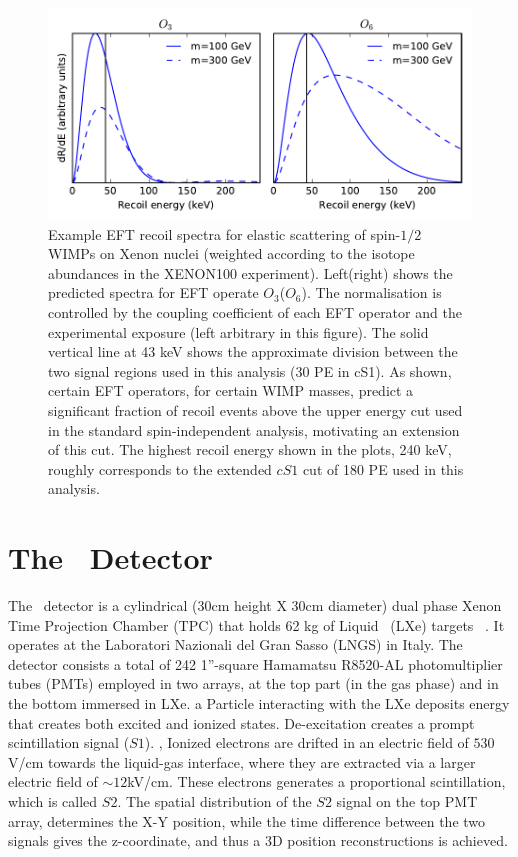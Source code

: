 \begin{itemize}
\begin{figure}[h!]
\begin{minipage}{1.\linewidth}
\centerline{\includegraphics[width=1.\linewidth]{Figures/dRdE_examples.pdf}}
\end{minipage}
\caption{Example EFT recoil spectra for elastic scattering of spin-$1/2$ WIMPs on Xenon nuclei (weighted according to the isotope abundances in the XENON100 experiment). Left(right) shows the predicted spectra for EFT operate $O_3$($O_6$). The normalisation is controlled by the coupling coefficient of each EFT operator and the experimental exposure (left arbitrary in this figure). The solid vertical line at 43 keV shows the approximate division between the two signal regions used in this analysis (30 PE in cS1). As shown, certain EFT operators, for certain WIMP masses, predict a significant fraction of recoil events above the upper energy cut used in the standard spin-independent analysis, motivating an extension of this cut. The highest recoil energy shown in the plots, 240 keV, roughly corresponds to the extended $cS1$ cut of 180 PE used in this analysis.}
\label{fig:dRdE}
\end{figure}


\end{itemize}
\section{The \Xehund\  Detector}
The \Xehund\ detector is a cylindrical (30cm height X 30cm diameter) dual phase Xenon Time Projection Chamber (TPC) that holds 62 kg of Liquid \Xe\ (LXe) targets ~\cite{xe100_instr2012}. It operates at the Laboratori Nazionali del Gran Sasso (LNGS) in Italy. The detector consists a total of 242 1”-square Hamamatsu R8520-AL photomultiplier tubes (PMTs) employed in two arrays, at the top part (in the gas phase) and in the bottom immersed in LXe. a Particle interacting with the LXe deposits energy that creates both excited and ionized states. De-excitation creates a prompt scintillation signal ($S1$). ,  Ionized electrons are drifted in an electric field of $530$V/cm towards the liquid-gas interface, where they are extracted via a larger electric field of $\sim12$kV/cm. These electrons generates a proportional scintillation, which is called $S2$. The spatial distribution of the $S2$ signal on the top PMT array, determines the X-Y position, while the time difference between the two signals gives the z-coordinate, and thus a 3D position reconstructions is achieved.

